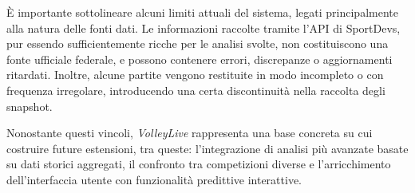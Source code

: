 \documentclass[a4paper,12pt]{report}
\begin{document}
È importante sottolineare alcuni limiti attuali del sistema, legati principalmente alla natura delle fonti dati. Le informazioni raccolte tramite l’API di SportDevs, pur essendo sufficientemente ricche per le analisi svolte, non costituiscono una fonte ufficiale federale, e possono contenere errori, discrepanze o aggiornamenti ritardati. Inoltre, alcune partite vengono restituite in modo incompleto o con frequenza irregolare, introducendo una certa discontinuità nella raccolta degli snapshot.

Nonostante questi vincoli, \textit{VolleyLive} rappresenta una base concreta su cui costruire future estensioni, tra queste: l’integrazione di analisi più avanzate basate su dati storici aggregati, il confronto tra competizioni diverse e l’arricchimento dell’interfaccia utente con funzionalità predittive interattive.
\end{document}
